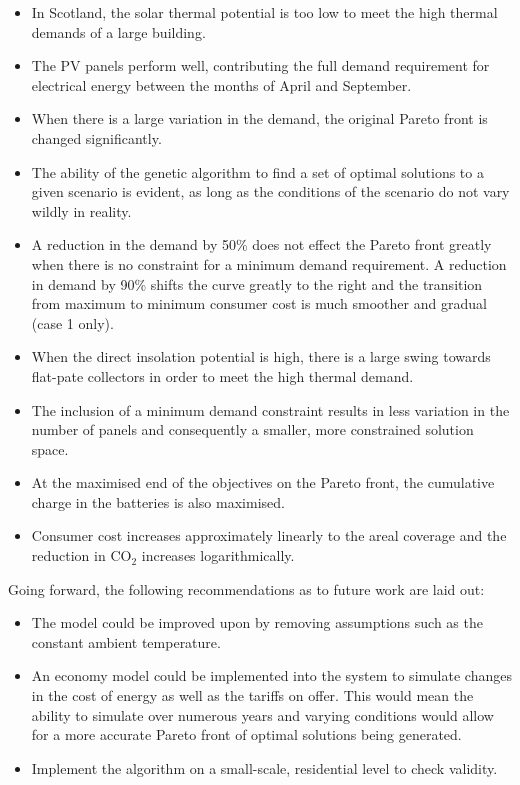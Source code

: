 \begin{itemize}
\item In Scotland, the solar thermal potential is too low to meet the high thermal demands of a large building. 

\item The PV panels perform well, contributing the full demand requirement for electrical energy between the months of April and September.

\item When there is a large variation in the demand, the original Pareto front is changed significantly.

\item The ability of the genetic algorithm to find a set of optimal solutions to a given scenario is evident, as long as the conditions of the scenario do not vary wildly in reality.

\item A reduction in the demand by 50\% does not effect the Pareto front greatly when there is no constraint for a minimum demand requirement. A reduction in demand by 90\% shifts the curve greatly to the right and the transition from maximum to minimum consumer cost is much smoother and gradual (case 1 only).

\item When the direct insolation potential is high, there is a large swing towards flat-pate collectors in order to meet the high thermal demand.

\item The inclusion of a minimum demand constraint results in less variation in the number of panels and consequently a smaller, more constrained solution space.

\item At the maximised end of the objectives on the Pareto front, the cumulative charge in the batteries is also maximised. 

\item Consumer cost increases approximately linearly to the areal coverage and the reduction in CO$_2$ increases logarithmically.

\end{itemize}

Going forward, the following recommendations as to future work are laid out:

\begin{itemize}
\item The model could be improved upon by removing assumptions such as the constant ambient temperature. 

\item An economy model could be implemented into the system to simulate changes in the cost of energy as well as the tariffs on offer. This would mean the ability to simulate over numerous years and varying conditions would allow for a more accurate Pareto front of optimal solutions being generated.

\item Implement the algorithm on a small-scale, residential level to check validity.

\end{itemize}

